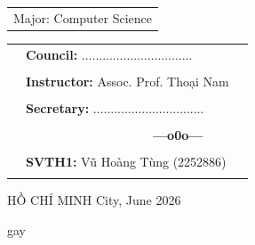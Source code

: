 \documentclass[a4paper]{report}
\theoremstyle{definition}
\begin{document}
\begin{titlepage}
\begin{center}
\begin{tabular}{c}
\\ \vspace{0.5cm} {\Large Major: Computer Science}
\end{tabular}
\end{center}
\vspace{0.5cm}
\begin{table}[h]
\begin{tabular}{rll}
\hspace{6 cm} &  \textbf{\Large Council:} {\Large ................................}
\\
\\
\hspace{6 cm} &   \textbf{\Large Instructor:} {\Large Assoc. Prof. Thoại Nam}
\\
\\
\hspace{6 cm}  &   \textbf{\Large Secretary:} {\Large ................................}
\\
\\
\hspace{6 cm} &     \textbf{$\;$ $\;$$\;$$\;$$\;$$\;$$\;$$\;$$\;$$\;$$\;$$\;$$\;$$\;$$\;$$\;$$\;$$\;$$\;$$\;$$\;$$\;$$\;$$\;$$\;$$\;$$\;$$\;$$\;$$\;$$\;$$\;$$\;$$\;$ \Large ---o0o---} 
\\
\\
\hspace{6 cm} &   \textbf{\Large SVTH1:} {\Large Vũ Hoàng Tùng (2252886)}
\\
\\
\end{tabular}
\end{table}
\vspace{0.5cm}
\begin{center}
{\Large HỒ CHÍ MINH City, June 2026 }
\end{center}
\end{titlepage}
\newpage



\newpage
\tableofcontents
\newpage
\listoffigures
\newpage
\listoftables
\newpage
\setcounter{page}{1}


\newpage

\newpage

\newpage


gay \cite{CoDeKG}
\newpage



\nocite{*}
\end{document}
